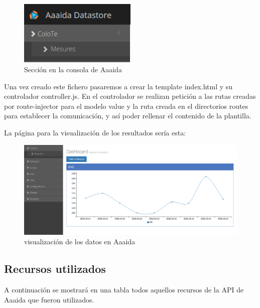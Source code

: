 \begin{figure}[htb]
\begin{center}
\includegraphics[width=0.5\textwidth]{./setup/arquitecturaCoiote}
\caption{Sección en la consola de Aaaida}
\label{sec:coioteSec}
\end{center}
\end{figure}

Una vez creado este fichero pasaremos a crear la template index.html y su controlador controller.js. En el controlador se realizan petición a las rutas creadas por route-injector para el modelo value y la ruta creada en el directorios routes para establecer la comunicación, y así poder rellenar el contenido de la plantilla.

La página para la visualización de los resultados sería esta:

\begin{figure}[htb]
\begin{center}
\includegraphics[width=1\textwidth]{./setup/visualizacionPaginaCoiote}
\caption{visualización de los datos en Aaaida}
\end{center}
\end{figure}
\pagebreak

\subsection{Recursos utilizados}

A continuación se mostrará en una tabla todos aquellos recursos de la API de Aaaida que fueron utilizados. 


